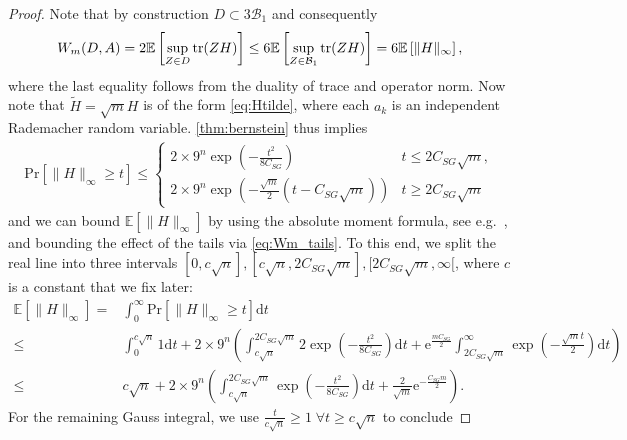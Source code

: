 \begin{proof}
Note that by construction $D \subset 3 \mathcal{B}_1$ and consequently
\begin{align}
  W_m (D,  A) = 2 \mathbb{E} \left[ \sup_{ Z \in D} \operatorname{tr} ( Z  H) \right] \leq 6 \mathbb{E} \left[ \sup_{ Z \in \mathcal{B}_1} \operatorname{tr} ( Z  H) \right] = 6 \mathbb{E} \left[ \|  H \|_\infty  \right], \label{eq:Wm_hoelder}
\end{align}
where the last equality follows from the duality of trace and operator norm. Now note that $\tilde{ H} = \sqrt{m}  H$ is of the form \eqref{eq:Htilde}, where each $a_k$ is an independent Rademacher random variable.
\cref{thm:bernstein} thus implies
\begin{align}
  \mathrm{Pr} \left[\|  H \|_\infty \geq t \right]
  \leq
  \begin{cases}
   2 \times 9^n \exp \left( - \frac{t^2}{8 C_{SG}} \right) & t \leq 2C_{SG} \sqrt{m}, \\
  2 \times 9^n \exp \left( - \frac{\sqrt{m}}{2} \left( t - C_{SG} \sqrt{m} \right) \right) & t \geq 2 C_{SG} \sqrt{m}
  \end{cases}
  \label{eq:Wm_tails}
\end{align}
and we can bound $\mathbb{E} \left[ \|  H \|_\infty \right]$ by using the absolute moment formula,
see e.g.\ \cite[Propostion~7.1]{Foucart_2013_Mathematical}, and bounding the effect of the tails via \eqref{eq:Wm_tails}.
To this end, we split the real line into three intervals $[0, c \sqrt{n}], [c\sqrt{n}, 2 C_{SG} \sqrt{m}], [2 C_{SG} \sqrt{m},\infty[$, where $c$ is a constant that we fix later:
\begin{align}
  \mathbb{E} \left[ \| H\|_\infty \right] =& \int_0^\infty \mathrm{Pr} \left[ \| H\|_\infty \geq t \right] \mathrm{d}t \\
  \leq & \int_0^{c \sqrt{n}} 1 \mathrm{d}t + 2 \times 9^n \left( \int_{c \sqrt{n}}^{2 C_{SG} \sqrt{m}} 2 \exp \left( - \frac{t^2}{8 C_{SG}} \right) \mathrm{d}t
  +  \mathrm{e}^{\frac{m C_{SG}}{2}} \int_{2 C_{SG} \sqrt{m}}^\infty \exp\left( - \frac{\sqrt{m}t}{2}  \right) \mathrm{d} t \right)\\
  \leq & c \sqrt{n} + 2 \times 9^n \left( \int_{c \sqrt{n}}^{2 C_{SG} \sqrt{m}}  \exp \left( - \frac{t^2}{8 C_{SG}} \right) \mathrm{d}t
  + \frac{2}{\sqrt{m}} \mathrm{e}^{-\frac{C_{SG} m}{2}}\right).
\end{align}
For the remaining Gauss integral, we use $\frac{t}{c \sqrt{n}} \geq 1\; \forall t \geq c\sqrt{n}$ to conclude

\end{proof}
